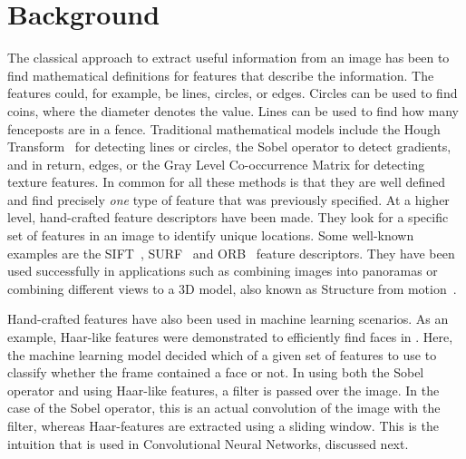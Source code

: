\chapter{Background}

The classical approach to extract useful information from an image has been to find mathematical definitions for features that describe the information. The features could, for example, be lines, circles, or edges. 
Circles can be used to find coins, where the diameter denotes the value. Lines can be used to find how many fenceposts are in a fence. Traditional mathematical models include the Hough Transform~\cite{houghTransform} for detecting lines or circles, the Sobel operator to detect gradients, and in return, edges, or the Gray Level Co-occurrence Matrix for detecting texture features. 
In common for all these methods is that they are well defined and find precisely \emph{one} type of feature that was previously specified. 
At a higher level, hand-crafted feature descriptors have been made. They look for a specific set of features in an image to identify unique locations. Some well-known examples are the SIFT~\cite{sift1999Lowe}, SURF~\cite{surf2006Bay} and ORB~\cite{orb2011Rublee} feature descriptors. They have been used successfully in applications such as combining images into panoramas or combining different views to a 3D model, also known as Structure from motion~\cite{sfm1979ullman}.

Hand-crafted features have also been used in machine learning scenarios. As an example, Haar-like features were demonstrated to efficiently find faces in \cite{haarcascade}. Here, the machine learning model decided which of a given set of features to use to classify whether the frame contained a face or not. In using both the Sobel operator and using Haar-like features, a filter is passed over the image. In the case of the Sobel operator, this is an actual convolution of the image with the filter, whereas Haar-features are extracted using a sliding window. This is the intuition that is used in Convolutional Neural Networks, discussed next.

